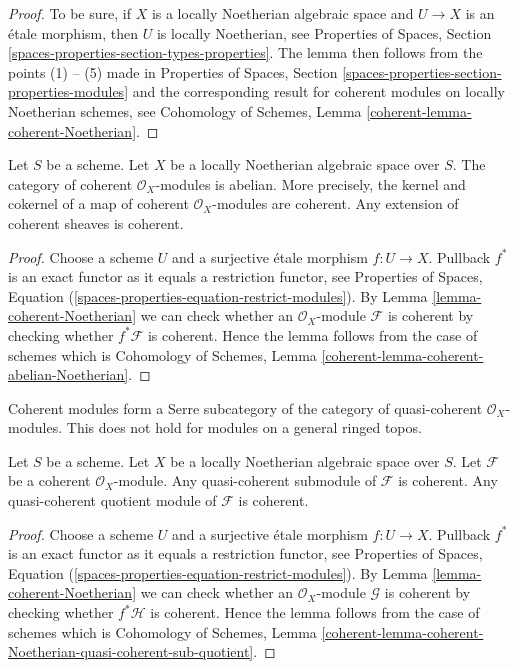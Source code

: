 \begin{proof}
To be sure, if $X$ is a locally Noetherian algebraic space and
$U \to X$ is an \'etale morphism, then $U$ is locally Noetherian, see
Properties of Spaces, Section \ref{spaces-properties-section-types-properties}.
The lemma then follows from the points (1) -- (5) made in
Properties of Spaces, Section \ref{spaces-properties-section-properties-modules}
and the corresponding result for coherent modules on locally
Noetherian schemes, see
Cohomology of Schemes, Lemma \ref{coherent-lemma-coherent-Noetherian}.
\end{proof}

\begin{lemma}
\label{lemma-coherent-abelian-Noetherian}
Let $S$ be a scheme. Let $X$ be a locally Noetherian algebraic space over $S$.
The category of coherent $\mathcal{O}_X$-modules is abelian. More precisely,
the kernel and cokernel of a map of coherent $\mathcal{O}_X$-modules are
coherent. Any extension of coherent sheaves is coherent.
\end{lemma}

\begin{proof}
Choose a scheme $U$ and a surjective \'etale morphism $f : U \to X$.
Pullback $f^*$ is an exact functor as it equals a restriction functor, see
Properties of Spaces, Equation
(\ref{spaces-properties-equation-restrict-modules}).
By
Lemma \ref{lemma-coherent-Noetherian} we can check whether an
$\mathcal{O}_X$-module $\mathcal{F}$ is
coherent by checking whether $f^*\mathcal{F}$ is coherent. Hence the
lemma follows from the case of schemes which is
Cohomology of Schemes, Lemma \ref{coherent-lemma-coherent-abelian-Noetherian}.
\end{proof}

\noindent
Coherent modules form a Serre subcategory of the
category of quasi-coherent $\mathcal{O}_X$-modules. This does not hold
for modules on a general ringed topos.

\begin{lemma}
\label{lemma-coherent-Noetherian-quasi-coherent-sub-quotient}
Let $S$ be a scheme.
Let $X$ be a locally Noetherian algebraic space over $S$.
Let $\mathcal{F}$ be a coherent $\mathcal{O}_X$-module.
Any quasi-coherent submodule of $\mathcal{F}$ is coherent.
Any quasi-coherent quotient module of $\mathcal{F}$ is coherent.
\end{lemma}

\begin{proof}
Choose a scheme $U$ and a surjective \'etale morphism $f : U \to X$.
Pullback $f^*$ is an exact functor as it equals a restriction functor, see
Properties of Spaces, Equation
(\ref{spaces-properties-equation-restrict-modules}).
By
Lemma \ref{lemma-coherent-Noetherian} we can check whether an
$\mathcal{O}_X$-module $\mathcal{G}$ is
coherent by checking whether $f^*\mathcal{H}$ is coherent. Hence the
lemma follows from the case of schemes which is
Cohomology of Schemes, Lemma
\ref{coherent-lemma-coherent-Noetherian-quasi-coherent-sub-quotient}.
\end{proof}

